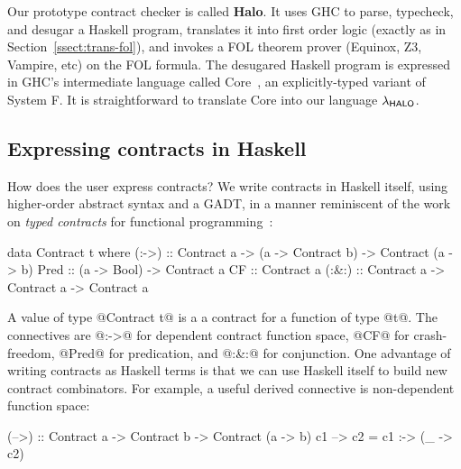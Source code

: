 Our prototype contract checker is called \textbf{Halo}.
It uses GHC to parse, typecheck, and desugar a Haskell program,
translates it into first order logic (exactly as in Section~\ref{ssect:trans-fol}), and
invokes a FOL theorem prover (Equinox, Z3, Vampire, etc) on the FOL formula.
The desugared Haskell program is expressed in GHC's intermediate language
called Core~\cite{Sulzmann:2007:SFT:1190315.1190324}, an explicitly-typed 
variant of System F.  It is straightforward
to translate Core into our language $\lambda_{\sf HALO}$.

\subsection{Expressing contracts in Haskell}

How does the user express contracts?  We write contracts in Haskell
itself, using higher-order abstract syntax and a GADT, in 
a manner reminiscent 
of the work on {\em typed contracts} for functional 
programming~\cite{Hinze:2006:TCF:2100071.2100093}:
\begin{code}
data Contract t where
  (:->) :: Contract a 
        -> (a -> Contract b)
        -> Contract (a -> b)
  Pred  :: (a -> Bool) -> Contract a
  CF    :: Contract a
  (:&:) :: Contract a -> Contract a -> Contract a
\end{code}
A value of type @Contract t@ is a 
a contract for a function of type @t@.
The connectives are @:->@ for dependent contract function space, @CF@
for crash-freedom, @Pred@ for predication, and
@:&:@ for conjunction. 
One advantage of writing contracts as Haskell terms is that
we can use Haskell itself to build new contract combinators.
For example, a useful derived connective is non-dependent function space:
\par {\small
\begin{code}
(-->) :: Contract a -> Contract b -> Contract (a -> b)
c1 --> c2 = c1 :-> (\_ -> c2)
\end{code}
} \par
%
%

